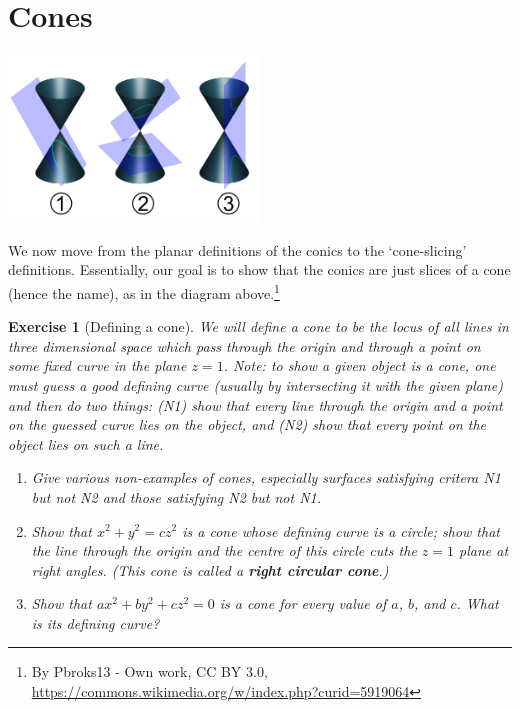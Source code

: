 \documentclass[a4paper,leqno,9pt]{article}
\theoremstyle{exercise}
\newtheorem{exercise}{Exercise}
\theoremstyle{plain}
\theoremstyle{definition}
\newcommand{\df}[1]{\textbf{#1}}
\begin{document}
\section{Cones}
\begin{center}
  \includegraphics[width=0.5\textwidth]{slices}
\end{center}
We now move from the planar definitions of the conics to the `cone-slicing' definitions. Essentially, our goal
is to show that the conics are just slices of a cone (hence the name), as in the diagram above.\footnote{By Pbroks13 - Own work, CC BY 3.0, \url{https://commons.wikimedia.org/w/index.php?curid=5919064}}

\begin{exercise}[Defining a cone]
  We will define a cone to be the locus of all lines in three dimensional space which pass through the origin and through a point on some
  fixed curve in the plane $ z = 1 $. Note: to show a given object is a cone, one must guess a good defining curve (usually by intersecting
  it with the given plane) and then do two things: (N1) show that every line through the origin and a point on the guessed curve lies on the
  object, and (N2) show that every point on the object lies on such a line.
  \begin{enumerate}
    \item Give various non-examples of cones, especially surfaces satisfying critera N1 but not N2 and those satisfying N2 but not N1.
    \item Show that $ x^2 + y^2 = cz^2 $ is a cone whose defining curve is a circle; show that the line through the origin and the centre
          of this circle cuts the $ z = 1 $ plane at right angles. (This cone is called a \df{right circular cone}.)
    \item Show that $ ax^2 + by^2 + cz^2 = 0 $ is a cone for every value of $ a $, $ b $, and $ c $. What is its defining curve?
  \end{enumerate}
\end{exercise}
\end{document}
